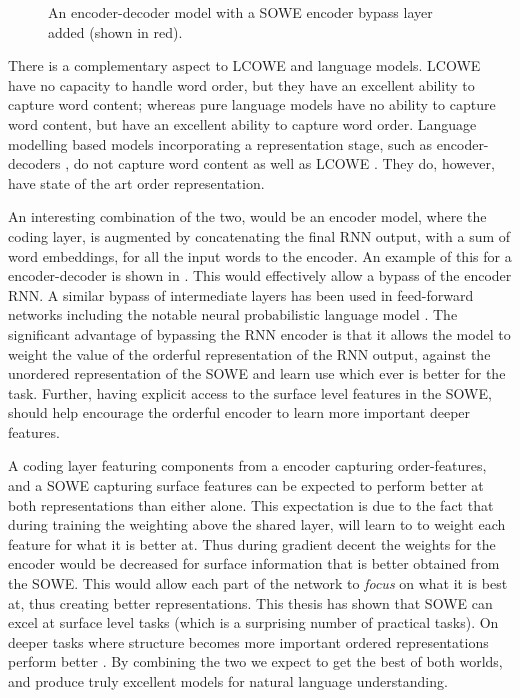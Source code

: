 \documentclass{book}
\begin{document}
\begin{figure}
{
	}
	\caption{An encoder-decoder model with a SOWE encoder bypass layer added (shown in red). \label{fig:enhancedencoderdecoder}}
\end{figure}


There is a complementary aspect to LCOWE and language models.
LCOWE have no capacity to handle word order, but they have an excellent ability to capture word content;
whereas pure language models have no ability to capture word content, but have an excellent ability to capture word order.
Language modelling based models incorporating a representation stage, such as encoder-decoders \citep{cho-EtAl:2014:EMNLP2014}, do not capture word content as well as LCOWE \citep{ac2018probingsentencevectors}.
They do, however, have state of the art order representation.

An interesting combination of the two,
would be an encoder model,
where the coding layer,
is augmented by concatenating the final RNN output, with a sum of word embeddings, for all the input words to the encoder.
An example of this for a encoder-decoder is shown in .
This would effectively allow a bypass of the encoder RNN.
A similar bypass of intermediate layers has been used in feed-forward networks including the notable neural probabilistic language model \citep{NPLM}.
The significant advantage of bypassing the RNN encoder is that it allows the model to weight the value of the orderful representation of the RNN output, against the unordered representation of the SOWE and learn use which ever is better for the task.
Further, having explicit access to the surface level features in the SOWE,
should help encourage the orderful encoder to learn more important deeper features.

A coding layer featuring components from a encoder capturing order-features, and a SOWE capturing surface features can be expected to perform better at both representations than either alone.
This expectation is due to the fact that during training the weighting  above  the shared layer, will learn to to weight each feature for what it is better at.
Thus during gradient decent the weights for the encoder would be decreased for surface information that is better obtained from the SOWE.
This would allow each part of the network to \emph{focus} on what it is best at, thus  creating better representations.
This thesis has shown that SOWE can excel at surface level tasks (which is a surprising number of practical tasks).
On deeper tasks where structure becomes more important ordered representations perform better \parencite{ac2018probingsentencevectors}.
By combining the two we expect to get the best of both worlds,
and produce truly excellent models for natural language understanding.
\end{document}
